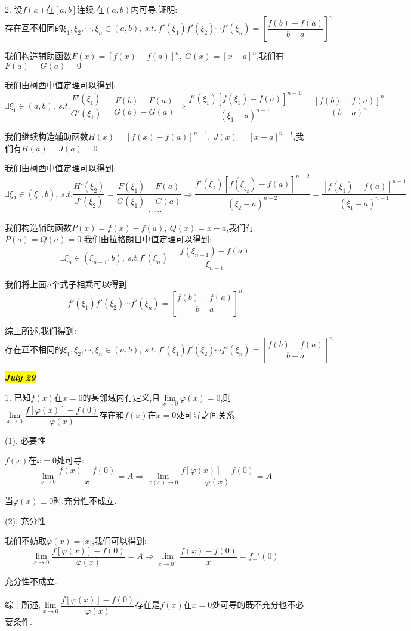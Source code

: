 2. 设$f(x)$在$[a,b]$连续,在$(a,b)$内可导,证明: $$\text{存在互不相同的}\xi_{1},\xi_{2},\cdots,\xi_{n}\in(a,b),\ s.t. \ f'(\xi_{1})f'(\xi_{2})\cdots f'(\xi_{n})=\left[ \dfrac{f(b)-f(a)}{b-a}\right]^{n}$$
\begin{solution}
	
	我们构造辅助函数$F(x)=\left[ f(x)-f(a)\right]^n,\ G(x)=\left[ x-a\right]^n $,我们有$F(a)=G(a)=0$
	
	我们由柯西中值定理可以得到: 
	$$\exists \xi_{1}\in(a,b),\ s.t. \dfrac{F'(\xi_{1})}{G'(\xi_{1})}=\dfrac{F(b)-F(a)}{G(b)-G(a)}\Rightarrow \dfrac{f'(\xi_{1})\left[f(\xi_{1})-f(a) \right]^{n-1}}{(\xi_{1}-a)^{n-1}}=\dfrac{\left[f(b)-f(a) \right]^n }{(b-a)^n}$$
	
	我们继续构造辅助函数$H(x)=\left[ f(x)-f(a)\right]^{n-1},\ J(x)=\left[ x-a\right]^{n-1} $,我们有$H(a)=J(a)=0$
	
	我们由柯西中值定理可以得到: 
	$$\exists \xi_{2}\in(\xi_{1},b),\ s.t. \dfrac{H'(\xi_{2})}{J'(\xi_{2})}=\dfrac{F(\xi_{1})-F(a)}{G(\xi_{1})-G(a)}\Rightarrow \dfrac{f'(\xi_{2})\left[f(\xi_{\xi_{2}})-f(a) \right]^{n-2}}{(\xi_{2}-a)^{n-2}}=\dfrac{\left[f(\xi_{1})-f(a) \right]^{n-1} }{(\xi_{1}-a)^{n-1}}$$
	$$\cdots\cdots$$
	
	我们构造辅助函数$P(x)=f(x)-f(a),\ Q(x)=x-a$,我们有$P(a)=Q(a)=0$
	我们由拉格朗日中值定理可以得到: 
	$$\exists \xi_{n}\in(\xi_{n-1},b),\ s.t. f'(\xi_{n})=\dfrac{f(\xi_{n-1})-f(a)}{\xi_{n-1}}$$
	
	我们将上面$n$个式子相乘可以得到: 
	$$f'(\xi_{1})f'(\xi_{2})\cdots f'(\xi_{n})=\left[ \dfrac{f(b)-f(a)}{b-a}\right]^{n}$$
	
	综上所述,我们得到: 
	$$\text{存在互不相同的}\xi_{1},\xi_{2},\cdots,\xi_{n}\in(a,b),\ s.t. \ f'(\xi_{1})f'(\xi_{2})\cdots f'(\xi_{n})=\left[ \dfrac{f(b)-f(a)}{b-a}\right]^{n}$$
\end{solution}

\hl{\textbf{\textit{July 29}}}

1. 已知$f(x)$在$x=0$的某邻域内有定义,且$\lim\limits_{x\rightarrow 0}\varphi(x)=0$,则$\lim\limits_{x\rightarrow 0}\dfrac{f[\varphi(x)]-f(0)}{\varphi(x)}$存在和$f(x)$在$x=0$处可导之间关系
\begin{solution}
	
	(1). 必要性
	
	$f(x)$在$x=0$处可导: 
	$$\lim\limits_{x\rightarrow 0}\dfrac{f(x)-f(0)}{x}=A\Rightarrow \lim\limits_{\varphi(x)\rightarrow 0}\dfrac{f[\varphi(x)]-f(0)}{\varphi(x)}=A$$
	
	当$\varphi(x)\equiv 0$时,充分性不成立.
	
	(2). 充分性
	
	我们不妨取$\varphi(x)=|x|$,我们可以得到: 
	$$\lim\limits_{x\rightarrow 0}\dfrac{f[\varphi(x)]-f(0)}{\varphi(x)}=A\Rightarrow \lim\limits_{x\rightarrow 0^{+}}\dfrac{f(x)-f(0)}{x}=f_{+}'(0)$$
	
	充分性不成立.
	
	综上所述,$\lim\limits_{x\rightarrow 0}\dfrac{f[\varphi(x)]-f(0)}{\varphi(x)}$存在是$f(x)$在$x=0$处可导的既不充分也不必要条件.
\end{solution}

